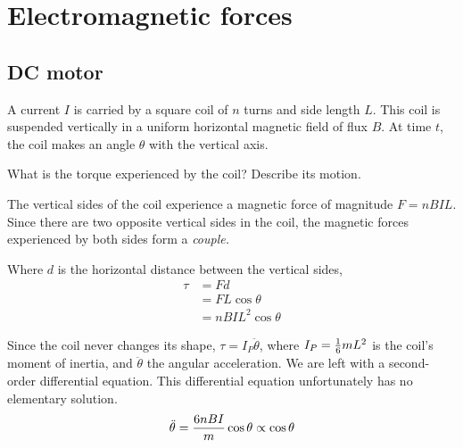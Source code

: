 \chapter{Electromagnetic forces}

\section{DC motor}
\begin{problem}
A current \(I\) is carried by a square coil of \(n\) turns
and side length \(L\). This coil is suspended vertically
in a uniform horizontal magnetic field of flux \(B\).
At time \(t\), the coil makes an angle \(\theta\) with
the vertical axis.

What is the torque experienced by the coil? Describe its motion.
\end{problem}

The vertical sides of the coil experience a magnetic force of magnitude
\(F = nBIL\). Since there are two opposite vertical sides in the coil,
the magnetic forces experienced by both sides form a \it{couple}.

Where \(d\) is the horizontal distance between the vertical sides,
\begin{align*}
	\tau & = Fd               \\
	     & = FL\cos\theta     \\
	     & = nBIL^2\cos\theta
\end{align*}

Since the coil never changes its shape, \(\tau = I_P\ddot{\theta}\),
where \(I_P = \frac{1}{6}mL^2\) is the coil's moment of inertia, and \(\ddot{\theta}\) the angular acceleration.
We are left with a
second-order differential equation. This differential
equation unfortunately has no elementary solution.
\begin{equation*}
	\ddot{\theta} = \frac{6nBI}{m} \cos\theta \propto \cos\theta
\end{equation*}

